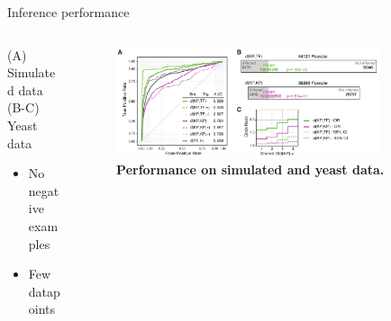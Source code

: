 \begin{frame}{Inference performance}
\begin{columns}
\begin{column}{0.2\textwidth}
(A) Simulated data \\
(B-C) Yeast data
\begin{itemize}
    \item No negative examples
    \item Few datapoints
\end{itemize}
\end{column}

\begin{column}{0.8\textwidth}
\begin{figure}[ht]
    \centering
    \includegraphics[width=0.85\textwidth]{analysis/fig/Fig3.pdf}
    \caption{\textbf{Performance on simulated and yeast data.} \\  }
    \label{fig:minimum_performance}
\end{figure}
\end{column}
\end{columns}
\end{frame}
